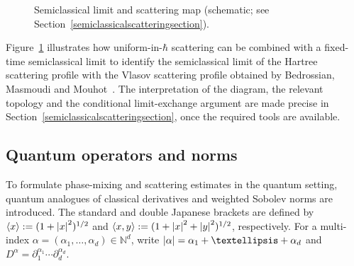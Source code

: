 \documentclass[11pt]{article}
\theoremstyle{plain}
\theoremstyle{remark}
\newcommand{\p}{\partial}
\newcommand{\jb}[1]{\langle#1\rangle}
\begin{document}
\begin{figure}[ht]
\vspace{0cm}
\centering
{}
\captionsetup{width=.8\linewidth}
\caption{Semiclassical limit and scattering map (schematic; see Section~\ref{semiclassicalscatteringsection}).}
\label{map}
\end{figure}
Figure~\ref{map} illustrates how uniform-in-$\hbar$ scattering can be combined with a fixed-time semiclassical limit to identify the semiclassical limit of the Hartree scattering profile with the Vlasov scattering profile obtained by Bedrossian, Masmoudi and Mouhot~\cite{BedrossianMasmoudiMouhot2018}. The interpretation of the diagram, the relevant topology and the conditional limit-exchange argument are made precise in Section~\ref{semiclassicalscatteringsection}, once the required tools are available.

\subsection{Quantum operators and norms} To formulate phase-mixing and scattering estimates in the quantum setting, quantum analogues of classical derivatives and weighted Sobolev norms are introduced. The standard and double Japanese brackets are defined by $\jb{x}:=(1+\abs{x}^2)^{1/2}$ and $\jb{x,y}:=(1+\abs{x}^2+\abs{y}^2)^{1/2}$, respectively. For a multi-index $\alpha=(\alpha_1,\dots,\alpha_d)\in\mathbb N^d$, write
$\abs{\alpha}=\alpha_1+\dots+\alpha_d$ and $D^{\alpha}=\p_1^{\alpha_1}\cdots\p_d^{\alpha_d}$.
\end{document}

